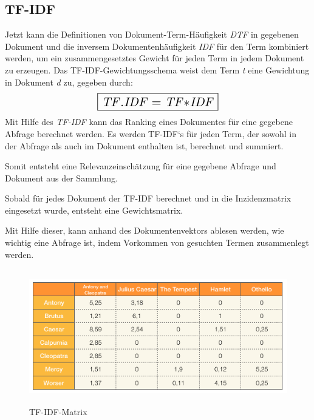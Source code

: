 \subsection[TF{}-IDF]{TF-IDF}
Jetzt kann die Definitionen von Dokument-Term-Häufigkeit \textit{DTF} in
gegebenen Dokument und die inversem Dokumentenhäufigkeit \textit{IDF} für den
Term kombiniert werden, um ein zusammengesetztes Gewicht für jeden Term
in jedem Dokument zu erzeugen.
\newline
Das TF-IDF-Gewichtungsschema weist dem Term \textit{t} eine Gewichtung in
Dokument \textit{d} zu, gegeben durch:
\begin{equation*}
\scalebox{1.5}{\boxed{\mathit{TF}.\mathit{IDF}=\mathit{TF}{\ast}\mathit{IDF}}}
\end{equation*}
Mit Hilfe des \textit{TF-IDF} kann das Ranking eines Dokumentes für eine gegebene
Abfrage berechnet werden. Es werden TF-IDF‘s für jeden Term, der sowohl
in der Abfrage als auch im Dokument enthalten ist, berechnet und
summiert.

Somit entsteht eine Relevanzeinschätzung für eine gegebene Abfrage und
Dokument aus der Sammlung.
\newline
\begin{figure}[h]
\centering
{}
\end{figure}

Sobald für jedes Dokument der TF-IDF berechnet und in die Inzidenzmatrix
eingesetzt wurde, entsteht eine Gewichtsmatrix.

Mit Hilfe dieser, kann anhand des Dokumentenvektors ablesen werden, wie
wichtig eine Abfrage ist, indem Vorkommen von gesuchten Termen
zusammenlegt werden.

\begin{figure}[h]
	\centering
	\includegraphics[width=13.208cm,height=5.854cm]{bilder/SeminararbeitArkadij-img5.png}
	\caption {TF-IDF-Matrix}
\end{figure}

